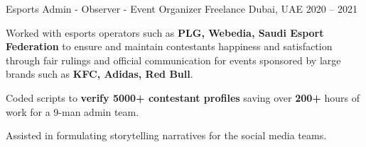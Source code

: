 \documentclass[]{awesome-cv}
\begin{document}
\begin{cventries}
	\vspace{1mm}

	\cventry
	{Esports Admin - Observer - Event Organizer}
	{Freelance}
	{Dubai, UAE}
	{2020 – 2021}
	{\begin{cvitems}
 		\item {Worked with esports operators such as \textbf{PLG, Webedia, Saudi Esport Federation} to ensure and maintain contestants happiness and satisfaction through fair rulings and official communication for events sponsored by large brands such as \textbf{KFC, Adidas, Red Bull}.}
		\item {Coded scripts to \textbf{verify 5000+ contestant profiles} saving over \textbf{200+} hours of work for a 9-man admin team.}
		\item {Assisted in formulating storytelling narratives for the social media teams.}
		\end{cvitems}}
\end{cventries}



\ 
\end{document}
